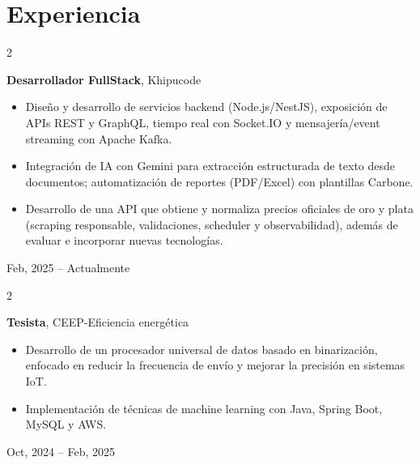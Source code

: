 \documentclass[10pt, letterpaper]{article}
\newenvironment{highlights}{
    \begin{itemize}[
        topsep=0.10 cm,
        parsep=0.10 cm,
        partopsep=0pt,
        itemsep=0pt,
        leftmargin=0 cm + 10pt
    ]
}{
    \end{itemize}
} %
\newenvironment{twocolentry}[2][]{
    \onecolentry
    \def\secondColumn{#2}
    \setcolumnwidth{\fill, 4.5 cm}
    \begin{paracol}{2}
}{
    \switchcolumn \raggedleft \secondColumn
    \end{paracol}
    \endonecolentry
} %
\begin{document}

    \section{Experiencia}
        
        \begin{twocolentry}{
            Feb, 2025 – Actualmente
        }
            \textbf{Desarrollador FullStack}, Khipucode

        \vspace{0.10 cm}
            \begin{highlights}
                \vspace{0.1 cm}
                \item Diseño y desarrollo de servicios backend (Node.js/NestJS), exposición de APIs REST y GraphQL, tiempo real con Socket.IO y mensajería/event streaming con Apache Kafka.
                \item Integración de IA con Gemini para extracción estructurada de texto desde documentos; automatización de reportes (PDF/Excel) con plantillas Carbone.
                \item Desarrollo de una API que obtiene y normaliza precios oficiales de oro y plata (scraping responsable, validaciones, scheduler y observabilidad), además de evaluar e incorporar nuevas tecnologías.
            \end{highlights}
        \end{twocolentry}


        \vspace{0.3 cm}
        
        \begin{twocolentry}{
            Oct, 2024 – Feb, 2025
        }
            \textbf{Tesista}, CEEP-Eficiencia energética

        \vspace{0.10 cm}
            \begin{highlights}
                \vspace{0.1 cm}
                \item Desarrollo de un procesador universal de datos basado en binarización, enfocado en reducir la frecuencia de envío y mejorar la precisión en sistemas IoT.
                \item Implementación de técnicas de machine learning con Java, Spring Boot, MySQL y AWS.
            \end{highlights}
            \end{twocolentry}
\end{document}
